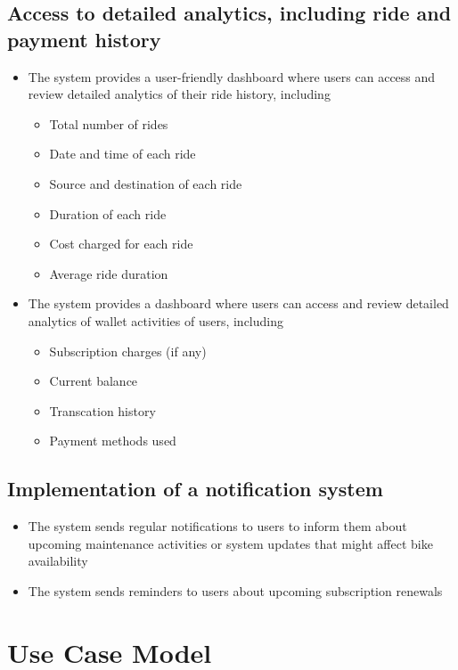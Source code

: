 \documentclass{scrreprt}
\begin{document}
\subsection{Access to detailed analytics, including ride and payment history}
\begin{itemize}
    \item The system provides a user-friendly dashboard where users can access and review detailed analytics of their ride history, including
    \begin{itemize}
        \item Total number of rides
        \item Date and time of each ride
        \item Source and destination of each ride
        \item Duration of each ride
        \item Cost charged for each ride
        \item Average ride duration
    \end{itemize}
    \item The system provides a dashboard where users can access and review detailed analytics of wallet activities of users, including
    \begin{itemize}
        \item Subscription charges (if any)
        \item Current balance
        \item Transcation history
        \item Payment methods used
    \end{itemize}
\end{itemize}

\subsection{Implementation of a notification system}
\begin{itemize}
    \item The system sends regular notifications to users to inform them about upcoming maintenance activities or system updates that might affect bike availability
    \item The system sends reminders to users about upcoming subscription renewals
\end{itemize}

\section{Use Case Model}
\end{document}
